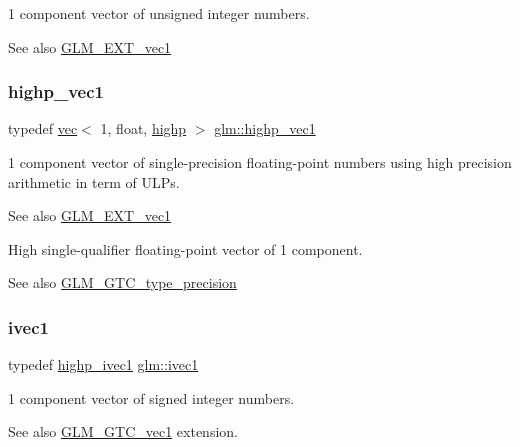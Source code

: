 1 component vector of unsigned integer numbers.

\begin{DoxySeeAlso}{See also}
\hyperlink{group__ext__vec1}{G\+L\+M\+\_\+\+E\+X\+T\+\_\+vec1} 
\end{DoxySeeAlso}
\mbox{\label{group__ext__vec1_gad8ebf6f2ad36cc3167e77f82b4ae9390}} 
\subsubsection{\texorpdfstring{highp\+\_\+vec1}{highp\_vec1}}
{\footnotesize\ttfamily typedef \hyperlink{structglm_1_1vec}{vec}$<$ 1, float, \hyperlink{namespaceglm_a36ed105b07c7746804d7fdc7cc90ff25ac6f7eab42eacbb10d59a58e95e362074}{highp} $>$ \hyperlink{group__ext__vec1_gad8ebf6f2ad36cc3167e77f82b4ae9390}{glm\+::highp\+\_\+vec1}}

1 component vector of single-\/precision floating-\/point numbers using high precision arithmetic in term of U\+L\+Ps.

\begin{DoxySeeAlso}{See also}
\hyperlink{group__ext__vec1}{G\+L\+M\+\_\+\+E\+X\+T\+\_\+vec1}
\end{DoxySeeAlso}
High single-\/qualifier floating-\/point vector of 1 component. \begin{DoxySeeAlso}{See also}
\hyperlink{group__gtc__type__precision}{G\+L\+M\+\_\+\+G\+T\+C\+\_\+type\+\_\+precision} 
\end{DoxySeeAlso}
\mbox{\label{group__ext__vec1_ga946031cea0c22745848ebd873e6facb0}} 
\subsubsection{\texorpdfstring{ivec1}{ivec1}}
{\footnotesize\ttfamily typedef \hyperlink{group__ext__vec1_gac44dcd92c25ab0d3f5c514137d5460d8}{highp\+\_\+ivec1} \hyperlink{group__ext__vec1_ga946031cea0c22745848ebd873e6facb0}{glm\+::ivec1}}

1 component vector of signed integer numbers. \begin{DoxySeeAlso}{See also}
\hyperlink{group__gtc__vec1}{G\+L\+M\+\_\+\+G\+T\+C\+\_\+vec1} extension. 
\end{DoxySeeAlso}
\mbox{\label{group__ext__vec1_ga861bf958322f2909514b1256be428490}} 
